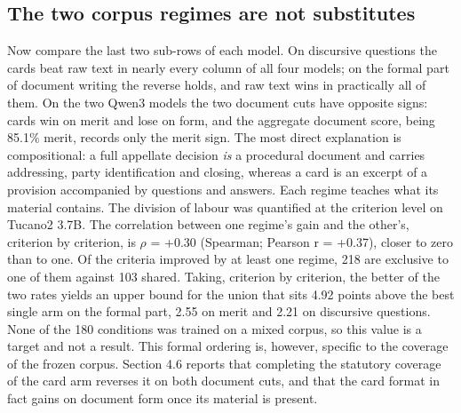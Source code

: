 \documentclass{IOS-Book-Article}
\begin{document}
\subsection{The two corpus regimes are not substitutes}
Now compare the last two sub-rows of each model. On discursive questions the cards beat raw text in nearly every column of all four models; on the formal part of document writing the reverse holds, and raw text wins in practically all of them. On the two Qwen3 models the two document cuts have opposite signs: cards win on merit and lose on form, and the aggregate document score, being 85.1\% merit, records only the merit sign.
The most direct explanation is compositional: a full appellate decision \emph{is} a procedural document and carries addressing, party identification and closing, whereas a card is an excerpt of a provision accompanied by questions and answers. Each regime teaches what its material contains. The division of labour was quantified at the criterion level on Tucano2 3.7B. The correlation between one regime's gain and the other's, criterion by criterion, is $\rho$ = +0.30 (Spearman; Pearson r = +0.37), closer to zero than to one. Of the criteria improved by at least one regime, 218 are exclusive to one of them against 103 shared. Taking, criterion by criterion, the better of the two rates yields an upper bound for the union that sits 4.92 points above the best single arm on the formal part, 2.55 on merit and 2.21 on discursive questions. None of the 180 conditions was trained on a mixed corpus, so this value is a target and not a result.
This formal ordering is, however, specific to the coverage of the frozen corpus. Section 4.6 reports that completing the statutory coverage of the card arm reverses it on both document cuts, and that the card format in fact gains on document form once its material is present.
\end{document}
